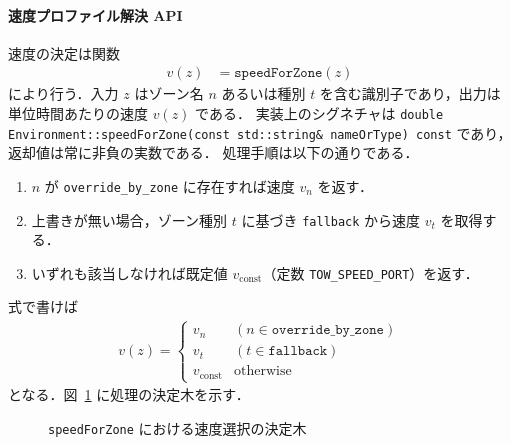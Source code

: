 \documentclass[10pt,letterpaper]{jsarticle}
\begin{document}
\paragraph{速度プロファイル解決 API}
速度の決定は関数
\begin{align}
  v(z) &= \texttt{speedForZone}(z)
\end{align}
により行う．入力 $z$ はゾーン名 $n$ あるいは種別 $t$ を含む識別子であり，出力は単位時間あたりの速度 $v(z)$ である．
実装上のシグネチャは \lstinline|double Environment::speedForZone(const std::string& nameOrType) const| であり，返却値は常に非負の実数である．
処理手順は以下の通りである．
\begin{enumerate}
  \item $n$ が \texttt{override\_by\_zone} に存在すれば速度 $v_n$ を返す．
  \item 上書きが無い場合，ゾーン種別 $t$ に基づき \texttt{fallback} から速度 $v_t$ を取得する．
  \item いずれも該当しなければ既定値 $v_{\mathrm{const}}$（定数 \texttt{TOW\_SPEED\_PORT}）を返す．
\end{enumerate}
式で書けば
\begin{align}
    v(z) = \begin{cases}
    v_n & (n \in \texttt{override\_by\_zone})\\
    v_t & (t \in \texttt{fallback})\\
    v_{\mathrm{const}} & \text{otherwise}
  \end{cases}
\end{align}
となる．図~\ref{fig:speed-tree} に処理の決定木を示す．

\begin{figure}[htbp]
  \centering
  \caption{\texttt{speedForZone} における速度選択の決定木}
  \label{fig:speed-tree}
\end{figure}
\end{document}
